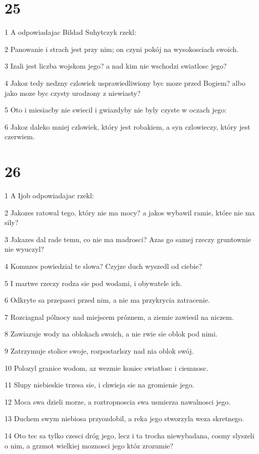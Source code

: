 \chapter{25}

\par 1 A odpowiadajac Bildad Suhytczyk rzekl:
\par 2 Panowanie i strach jest przy nim; on czyni pokój na wysokosciach swoich.
\par 3 Izali jest liczba wojskom jego? a nad kim nie wschodzi swiatlosc jego?
\par 4 Jakoz tedy nedzny czlowiek usprawiedliwiony byc moze przed Bogiem? albo jako moze byc czysty urodzony z niewiasty?
\par 5 Oto i miesiacby nie swiecil i gwiazdyby nie byly czyste w oczach jego:
\par 6 Jakoz daleko mniej czlowiek, który jest robakiem, a syn czlowieczy, który jest czerwiem.

\chapter{26}

\par 1 A Ijob odpowiadajac rzekl:
\par 2 Jakozes ratowal tego, który nie ma mocy? a jakos wybawil ramie, które nie ma sily?
\par 3 Jakazes dal rade temu, co nie ma madrosci? Azas go samej rzeczy gruntownie nie wyuczyl?
\par 4 Komuzes powiedzial te slowa? Czyjze duch wyszedl od ciebie?
\par 5 I martwe rzeczy rodza sie pod wodami, i obywatele ich.
\par 6 Odkryte sa przepasci przed nim, a nie ma przykrycia zatracenie.
\par 7 Rozciagnal pólnocy nad miejscem próznem, a ziemie zawiesil na niczem.
\par 8 Zawiazuje wody na oblokach swoich, a nie rwie sie oblok pod nimi.
\par 9 Zatrzymuje stolice swoje, rozpostarlszy nad nia oblok swój.
\par 10 Polozyl granice wodom, az wezmie koniec swiatlosc i ciemnosc.
\par 11 Slupy niebieskie trzesa sie, i chwieja sie na gromienie jego.
\par 12 Moca swa dzieli morze, a roztropnoscia swa usmierza nawalnosci jego.
\par 13 Duchem swym niebiosa przyozdobil, a reka jego stworzyla weza skretnego.
\par 14 Oto tec sa tylko czesci dróg jego, lecz i ta trocha niewybadana, cosmy slyszeli o nim, a grzmot wielkiej moznosci jego któz zrozumie?

